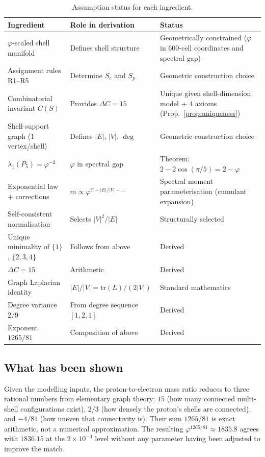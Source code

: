 \documentclass[12pt]{article}
\newcommand{\phig}{\varphi}
\begin{document}
\begin{table}[ht]
\centering
\caption{Assumption status for each ingredient.}
\label{tab:assumptions}
\begin{tabular}{@{}lll@{}}
\toprule
Ingredient & Role in derivation & Status \\
\midrule
$\phig$-scaled shell manifold & Defines shell structure & Geometrically constrained ($\phig$ in 600-cell coordinates and spectral gap) \\
Assignment rules R1--R5 & Determine $S_e$ and $S_p$ & Geometric construction choice \\
Combinatorial invariant $C(S)$ & Provides $\Delta C = 15$ & Unique given shell-dimension model + 4 axioms (Prop.~\ref{prop:uniqueness}) \\
Shell-support graph (1 vertex/shell) & Defines $|E|$, $|V|$, $\deg$ & Geometric construction choice \\
$\lambda_1(P_5) = \phig^{-2}$ & $\phig$ in spectral gap & Theorem: $2 - 2\cos(\pi/5) = 2 - \phig$ \\
Exponential law + corrections & $m \propto \phig^{C + |E|/|V| - \ldots}$ & Spectral moment parameterisation (cumulant expansion) \\
Self-consistent normalisation & Selects $|V|^2/|E|$ & Structurally selected \\
\midrule
Unique minimality of $\{1\}$, $\{2,3,4\}$ & Follows from above & Derived \\
$\Delta C = 15$ & Arithmetic & Derived \\
Graph Laplacian identity & $|E|/|V| = \mathrm{tr}(L)/(2|V|)$ & Standard mathematics \\
Degree variance $2/9$ & From degree sequence $[1,2,1]$ & Derived \\
Exponent $1265/81$ & Composition of above & Derived \\
\bottomrule
\end{tabular}
\end{table}

\subsection{What has been shown}

Given the modelling inputs, the proton-to-electron mass ratio reduces to three rational numbers from elementary graph theory: $15$ (how many connected multi-shell configurations exist), $2/3$ (how densely the proton's shells are connected), and $-4/81$ (how uneven that connectivity is). Their sum $1265/81$ is exact arithmetic, not a numerical approximation. The resulting $\phig^{1265/81} \approx 1835.8$ agrees with $1836.15$ at the $2 \times 10^{-4}$ level without any parameter having been adjusted to improve the match.
\end{document}
